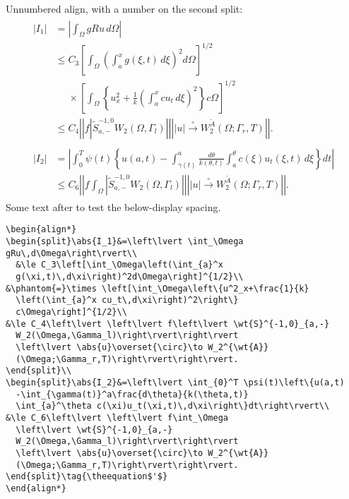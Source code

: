 \documentclass[mlq,fleqn]{w-art}
\newcommand{\ntt}{\normalfont\ttfamily}
\newcommand{\env}[1]{{\protect\ntt#1}}
\newcommand{\wt}{\widetilde}
\newcommand{\envert}[1]{\left\lvert#1\right\rvert}
\let\abs=\envert
\begin{document}

\newpage
Unnumbered \env{align}, with a number on the second \env{split}:
\begin{align*}
\begin{split}\abs{I_1}&=\left\lvert \int_\Omega gRu\,d\Omega\right\rvert\\
  &\le C_3\left[\int_\Omega\left(\int_{a}^x
  g(\xi,t)\,d\xi\right)^2d\Omega\right]^{1/2}\\
&\phantom{=}\times \left[\int_\Omega\left\{u^2_x+\frac{1}{k}
  \left(\int_{a}^x cu_t\,d\xi\right)^2\right\}
  c\Omega\right]^{1/2}\\
&\le C_4\left\lvert \left\lvert f\left\lvert \wt{S}^{-1,0}_{a,-}
  W_2(\Omega,\Gamma_l)\right\rvert\right\rvert
  \left\lvert \abs{u}\overset{\circ}\to W_2^{\wt{A}}
  (\Omega;\Gamma_r,T)\right\rvert\right\rvert.
\end{split}\\
\begin{split}\abs{I_2}&=\left\lvert \int_{0}^T \psi(t)\left\{u(a,t)
  -\int_{\gamma(t)}^a\frac{d\theta}{k(\theta,t)}
  \int_{a}^\theta c(\xi)u_t(\xi,t)\,d\xi\right\}dt\right\rvert\\
&\le C_6\left\lvert \left\lvert f\int_\Omega
  \left\lvert \wt{S}^{-1,0}_{a,-}
  W_2(\Omega,\Gamma_l)\right\rvert\right\rvert
  \left\lvert \abs{u}\overset{\circ}\to W_2^{\wt{A}}
  (\Omega;\Gamma_r,T)\right\rvert\right\rvert.
\end{split}\tag{\theequation$'$}
\end{align*}
Some text after to test the below-display spacing.

\begin{verbatim}
\begin{align*}
\begin{split}\abs{I_1}&=\left\lvert \int_\Omega gRu\,d\Omega\right\rvert\\
  &\le C_3\left[\int_\Omega\left(\int_{a}^x
  g(\xi,t)\,d\xi\right)^2d\Omega\right]^{1/2}\\
&\phantom{=}\times \left[\int_\Omega\left\{u^2_x+\frac{1}{k}
  \left(\int_{a}^x cu_t\,d\xi\right)^2\right\}
  c\Omega\right]^{1/2}\\
&\le C_4\left\lvert \left\lvert f\left\lvert \wt{S}^{-1,0}_{a,-}
  W_2(\Omega,\Gamma_l)\right\rvert\right\rvert
  \left\lvert \abs{u}\overset{\circ}\to W_2^{\wt{A}}
  (\Omega;\Gamma_r,T)\right\rvert\right\rvert.
\end{split}\\
\begin{split}\abs{I_2}&=\left\lvert \int_{0}^T \psi(t)\left\{u(a,t)
  -\int_{\gamma(t)}^a\frac{d\theta}{k(\theta,t)}
  \int_{a}^\theta c(\xi)u_t(\xi,t)\,d\xi\right\}dt\right\rvert\\
&\le C_6\left\lvert \left\lvert f\int_\Omega
  \left\lvert \wt{S}^{-1,0}_{a,-}
  W_2(\Omega,\Gamma_l)\right\rvert\right\rvert
  \left\lvert \abs{u}\overset{\circ}\to W_2^{\wt{A}}
  (\Omega;\Gamma_r,T)\right\rvert\right\rvert.
\end{split}\tag{\theequation$'$}
\end{align*}
\end{verbatim}
\end{document}

